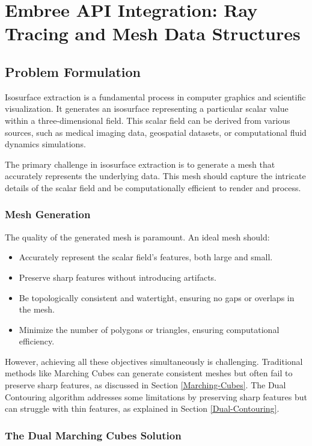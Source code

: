 \chapter{Embree API Integration: Ray Tracing and Mesh Data Structures} \label{Chapter4}

\section{Problem Formulation} \label{sec:Problem Formulation}
Isosurface extraction is a fundamental process in computer graphics and scientific visualization. It generates an isosurface representing a particular scalar value within a three-dimensional field. This scalar field can be derived from various sources, such as medical imaging data, geospatial datasets, or computational fluid dynamics simulations.

The primary challenge in isosurface extraction is to generate a mesh that accurately represents the underlying data. This mesh should capture the intricate details of the scalar field and be computationally efficient to render and process.

\subsection{Mesh Generation} The quality of the generated mesh is paramount. An ideal mesh should:

\begin{itemize}
    \item Accurately represent the scalar field's features, both large and small.
    \item Preserve sharp features without introducing artifacts.
    \item Be topologically consistent and watertight, ensuring no gaps or overlaps in the mesh.
    \item Minimize the number of polygons or triangles, ensuring computational efficiency.
\end{itemize}

However, achieving all these objectives simultaneously is challenging. Traditional methods like Marching Cubes can generate consistent meshes but often fail to preserve sharp features, as discussed in Section \ref{Marching-Cubes}. The Dual Contouring algorithm addresses some limitations by preserving sharp features but can struggle with thin features, as explained in Section \ref{Dual-Contouring}.

\subsection{The Dual Marching Cubes Solution} 


